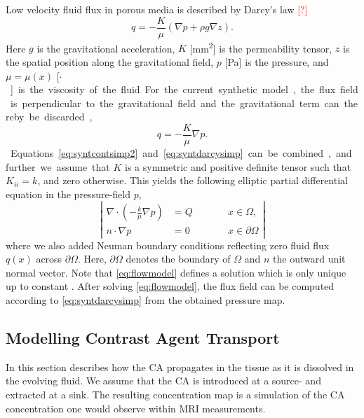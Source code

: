 \documentclass[paper=a4, fontsize=11pt,parskip=half,headings=small]{scrartcl}
\newcommand{\missingsource}{\textcolor{red}{[?]}}
\begin{document}
	Low velocity fluid flux in porous media is described by Darcy's law \missingsource
	\begin{equation}
		q = -\frac{K}{\mu} \left( \nabla p + \rho g  \nabla z \right).
	\end{equation}
	Here $g$ is the gravitational acceleration, $K$ [\si{\square\milli\meter}] is the permeability tensor, $z$ is the spatial position along the gravitational field, $p$ [\si{\pascal}] is the pressure, and $\mu = \mu(x)$ [\si{\pascal$\cdot$\second}] is the viscosity of the fluid.
	For the current synthetic model, the flux field is perpendicular to the gravitational field and the gravitational term can thereby be discarded,
	\begin{equation}
		q = -\frac{K}{\mu} \nabla p.
		\label{eq:syntdarcysimp}
	\end{equation}
	Equations \eqref{eq:syntcontsimp2} and \eqref{eq:syntdarcysimp} can be combined, and further we assume that $K$ is a symmetric and positive definite tensor such that $K_{ii} = k$, and zero otherwise.
	This yields the following elliptic partial differential equation in the pressure-field $p$,
	\begin{equation}
		\left\vert
		\begin{alignedat}{2}
			\nabla \cdot \left( -\frac{k}{\mu} \nabla p \right) &= Q  \qquad &&x \in \Omega, \\
			n \cdot \nabla p &=0 &&x \in \partial \Omega
		\end{alignedat}
		\right\vert 
		\label{eq:flowmodel}
	\end{equation}
	where we also added Neuman boundary conditions reflecting zero fluid flux $q(x)$ across $\partial \Omega$.
	Here, $\partial \Omega$ denotes the boundary of $\Omega$ and $n$ the outward unit normal vector. 
	Note that \eqref{eq:flowmodel} defines a solution which is only unique up to constant \cite{evans98}.
	After solving \eqref{eq:flowmodel}, the flux field can be computed according to \eqref{eq:syntdarcysimp} from the obtained pressure map. 
	
	
	\subsection{Modelling Contrast Agent Transport}\label{sec:transport}
	
	In this section describes how the CA propagates in the tissue as it is dissolved in the evolving fluid.
	We assume that the CA is introduced at a source- and extracted at a sink.
	The resulting concentration map is a simulation of the CA concentration one would observe within MRI measurements.
	
\end{document}
